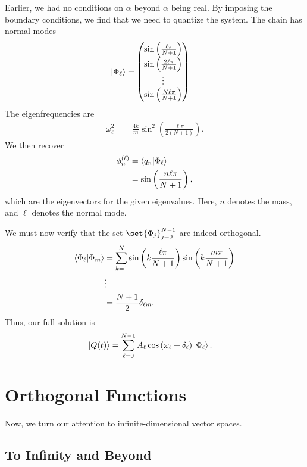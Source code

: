 \documentclass[10pt]{mypackage}
\begin{document}
\begin{example}
  Earlier, we had no conditions on $\alpha$ beyond $\alpha$ being real. By imposing the boundary conditions, we find that we need to quantize the system. The chain has normal modes
  {\renewcommand{\arraystretch}{1.5}
  \begin{align*}
    \ket{\Phi_{\ell}} &= \begin{pmatrix}\sin\left(\frac{\ell \pi}{N+1}\right) \\ \sin\left(\frac{2\ell \pi}{N+1}\right) \\\vdots \\ \sin\left(\frac{N\ell \pi}{N+1}\right)\end{pmatrix}
  \end{align*}
  }
  The eigenfrequencies are
  \begin{align*}
    \omega_{\ell}^2 &= \frac{4k}{m}\sin^2\left(\frac{\ell \pi}{2\left(N+1\right)}\right).
  \end{align*}
  We then recover
  \begin{align*}
    \phi_{n}^{\left(\ell\right)} &= \braket{q_n}{\Phi_{\ell}}\\
                                 &= \sin\left(\frac{n\ell \pi}{N+1}\right),
  \end{align*}
  which are the eigenvectors for the given eigenvalues. Here, $n$ denotes the mass, and $\ell$ denotes the normal mode.\newline

  We must now verify that the set $\set{\Phi_{j}}_{j=0}^{N-1}$ are indeed orthogonal.
  \begin{align*}
    \braket{\Phi_{\ell}}{\Phi_{m}} &= \sum_{k=1}^{N}\sin\left(k\frac{\ell \pi}{N+1}\right) \sin\left(k \frac{m\pi}{N+1}\right)\\
                                   &\vdots\\
                                   &= \frac{N+1}{2}\delta_{\ell m}.
  \end{align*}
  Thus, our full solution is
  \begin{align*}
    \ket{Q(t)} &= \sum_{\ell = 0}^{N-1}A_{\ell}\cos\left(\omega_{\ell} + \delta_{\ell}\right) \ket{\Phi_{\ell}}.
  \end{align*}
\end{example}
\section{Orthogonal Functions}%
Now, we turn our attention to infinite-dimensional vector spaces.
\subsection{To Infinity and Beyond}%
\end{document}
